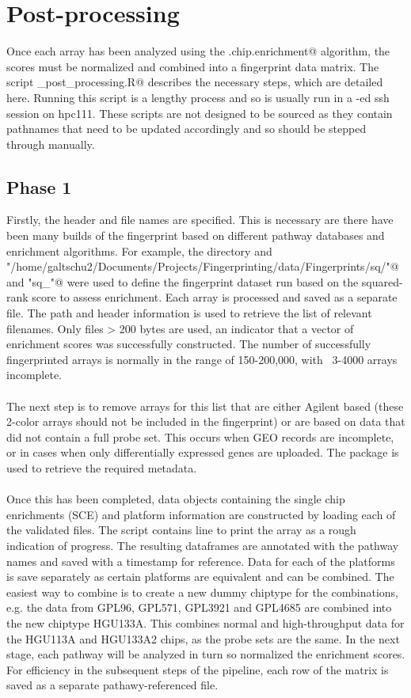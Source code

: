 \documentclass{article}
\begin{document}
\section{Post-processing}
Once each array has been analyzed using the \verb@single.chip.enrichment@ algorithm, the scores must be normalized and combined into a fingerprint data matrix. The script \verb@Fingerprint_post_processing.R@ describes the necessary steps, which are detailed here. Running this script is a lengthy process and so is usually run in a \verb@screen@-ed ssh session on hpc111. These scripts are not designed to be sourced as they contain pathnames that need to be updated accordingly and so should be stepped through manually.
\subsection{Phase 1}
Firstly, the header and file names are specified. This is necessary are there have been many builds of the fingerprint based on different pathway databases and enrichment algorithms. For example, the \verb@fingerpath@ directory and \verb@header@ \\ \verb@"/home/galtschu2/Documents/Projects/Fingerprinting/data/Fingerprints/sq/"@ and \verb@"sq_"@ were used to define the fingerprint dataset run based on the squared-rank score to assess enrichment. Each array is processed and saved as a separate file. The path and header information is used to retrieve the list of relevant filenames. Only files > 200 bytes are used, an indicator that a vector of enrichment scores was successfully constructed. The number of successfully fingerprinted arrays is normally in the range of 150-200,000, with ~3-4000 arrays incomplete.
\\ \\ The next step is to remove arrays for this list that are either Agilent based (these 2-color arrays should not be included in the fingerprint) or are based on data that did not contain a full probe set. This occurs when GEO records are incomplete, or in cases when only differentially expressed genes are uploaded. The package \verb@GEOmetadb@ is used to retrieve the required metadata.
\\ \\ Once this has been completed, data objects containing the single chip enrichments (SCE) and platform information are constructed by loading each of the validated files. The script contains line to print the array as a rough indication of progress. The resulting dataframes are annotated with the pathway names and saved with a timestamp for reference. Data for each of the platforms is save separately as certain platforms are equivalent and can be combined. The easiest way to combine is to create a new dummy chiptype for the combinations, e.g. the data from GPL96, GPL571, GPL3921 and GPL4685 are combined into the new chiptype HGU133A. This combines normal and high-throughput data for the HGU113A and HGU133A2 chips, as the probe sets are the same. In the next stage, each pathway will be analyzed in turn so normalized the enrichment scores. For efficiency in the subsequent steps of the pipeline, each row of the matrix is saved as a separate pathawy-referenced file.
\end{document}
